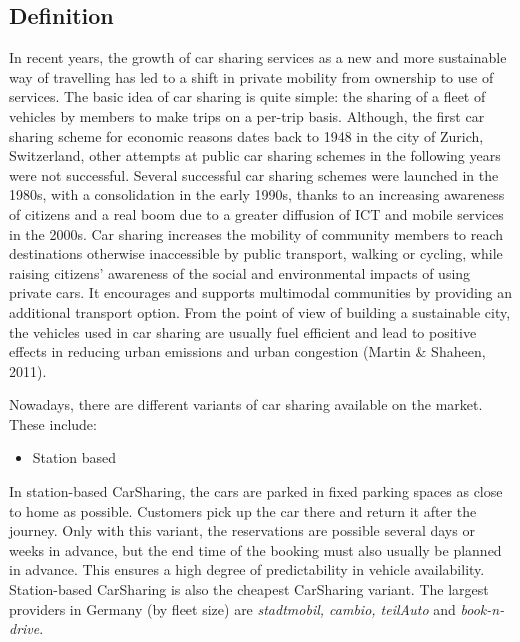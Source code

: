 \documentclass[
]{book}
\providecommand{\tightlist}{%
  \setlength{\itemsep}{0pt}\setlength{\parskip}{0pt}}
\begin{document}
\hypertarget{definition-42}{%
\subsection*{Definition}\label{definition-42}}

In recent years, the growth of car sharing services as a new and more sustainable way of travelling has led to a shift in private mobility from ownership to use of services. The basic idea of car sharing is quite simple: the sharing of a fleet of vehicles by members to make trips on a per-trip basis. Although, the first car sharing scheme for economic reasons dates back to 1948 in the city of Zurich, Switzerland, other attempts at public car sharing schemes in the following years were not successful. Several successful car sharing schemes were launched in the 1980s, with a consolidation in the early 1990s, thanks to an increasing awareness of citizens and a real boom due to a greater diffusion of ICT and mobile services in the 2000s. Car sharing increases the mobility of community members to reach destinations otherwise inaccessible by public transport, walking or cycling, while raising citizens' awareness of the social and environmental impacts of using private cars. It encourages and supports multimodal communities by providing an additional transport option. From the point of view of building a sustainable city, the vehicles used in car sharing are usually fuel efficient and lead to positive effects in reducing urban emissions and urban congestion (Martin \& Shaheen, 2011).

Nowadays, there are different variants of car sharing available on the market. These include:

\begin{itemize}
\tightlist
\item
  Station based
\end{itemize}

In station-based CarSharing, the cars are parked in fixed parking spaces as close to home as possible. Customers pick up the car there and return it after the journey. Only with this variant, the reservations are possible several days or weeks in advance, but the end time of the booking must also usually be planned in advance. This ensures a high degree of predictability in vehicle availability. Station-based CarSharing is also the cheapest CarSharing variant. The largest providers in Germany (by fleet size) are \emph{stadtmobil, cambio, teilAuto} and \emph{book-n-drive}.
\end{document}
